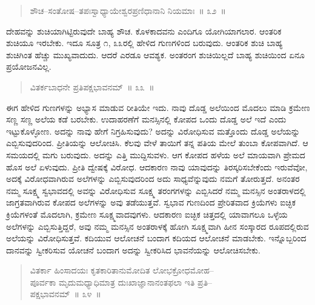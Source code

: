 \vspace{-0.3cm}

\begin{verse}
ಶೌಚ–ಸಂತೋಷ–ತಪಃಸ್ವಾಧ್ಯಾಯೇಶ್ವರಪ್ರಣಿಧಾನಾನಿ ನಿಯಮಾಃ~॥ ೩೨~॥
\end{verse}

\vspace{-0.3cm}


ದೇಹವನ್ನು ಶುಚಿಯಾಗಿಟ್ಟಿರುವುದೇ ಬಾಹ್ಯ ಶೌಚ. ಕೊಳಕಾದವನು ಎಂದಿಗೂ ಯೋಗಿಯಾಗಲಾರ. ಆಂತರಿಕ ಶುಚಿಯೂ ಇರಬೇಕು. ಇದೂ ಸೂತ್ರ ೧, ೩೩ರಲ್ಲಿ ಹೇಳಿದ ಗುಣಗಳಿಂದ ಬರುವುದು. ಆಂತರಿಕ ಶುಚಿ ಬಾಹ್ಯ ಶುಚಿಗಿಂತ ಹೆಚ್ಚು ಮುಖ್ಯವಾದುದು. ಆದರೆ ಎರಡೂ ಆವಶ್ಯಕ. ಅಂತರಂಗ ಶುಚಿಯಿಲ್ಲದೆ ಬಾಹ್ಯ ಶುಚಿಯಿಂದ ಏನೂ ಪ್ರಯೋಜನವಿಲ್ಲ. 

\vspace{-0.45cm}

\begin{verse}
ವಿತರ್ಕಬಾಧನೇ ಪ್ರತಿಪಕ್ಷಭಾವನಮ್​~॥ ೩೩~॥
\end{verse}

\vspace{-0.45cm}


ಈಗ ಹೇಳಿದ ಗುಣಗಳನ್ನು ಅಭ್ಯಾಸ ಮಾಡುವ ರೀತಿಯೇ ಇದು. ನಾವು ದೊಡ್ಡ ಅಲೆಯಿಂದ ಮೊದಲು ಮಾಡಿ ಕ್ರಮೇಣ ಸಣ್ಣ ಸಣ್ಣ ಅಲೆಯ ಕಡೆ ಬರಬೇಕು. ಉದಾಹರಣೆಗೆ ಮನಸ್ಸಿನಲ್ಲಿ ಕೋಪದ ಒಂದು ದೊಡ್ಡ ಅಲೆ ಇದೆ ಎಂದು ಇಟ್ಟುಕೊಳ್ಳೋಣ. ಅದನ್ನು ನಾವು ಹೇಗೆ ನಿಗ್ರಹಿಸುವುದು? ಅದನ್ನು ವಿರೋಧಿಸುವ ಮತ್ತೊಂದು ದೊಡ್ಡ ಅಲೆಯನ್ನು ಎಬ್ಬಿಸುವುದರಿಂದ. ಪ್ರೀತಿಯನ್ನು ಆಲೋಚಿಸಿ. ಕೆಲವು ವೇಳೆ ತಾಯಿಗೆ ತನ್ನ ಪತಿಯ ಮೇಲೆ ತುಂಬಾ ಕೋಪವಾಗಿದೆ. ಆ ಸಮಯದಲ್ಲಿ ಮಗು ಬರುವುದು. ಅದನ್ನು ಎತ್ತಿ ಮುದ್ದಿಸುವಳು. ಆಗ ಕೋಪದ ಹಳೆಯ ಅಲೆ ಮಾಯವಾಗಿ ಪ್ರೇಮದ ಹೊಸ ಅಲೆ ಏಳುವುದು. ಪ್ರೀತಿ ದ್ವೇಷಕ್ಕೆ ವಿರೋಧ. ಆದಕಾರಣ ನಾವು ಯಾವುದನ್ನು ತಿರಸ್ಕರಿಸಬೇಕೆಂದು ಇರುವೆವೋ, ಅದಕ್ಕೆ ವಿರೋಧವಾಗಿರುವ ಅಲೆಗಳನ್ನು ಎಬ್ಬಿಸುವುದರಿಂದ ಅದು ಸಾಧ್ಯವೆನ್ನುವುದು ನಮಗೆ ತೋರುತ್ತದೆ. ಅನಂತರ ನಮ್ಮ ಸೂಕ್ಷ್ಮ ಸ್ವಭಾವದಲ್ಲಿ ಅವನ್ನು ವಿರೋಧಿಸುವ ಸೂಕ್ಷ್ಮ ತರಂಗಗಳನ್ನು ಎಬ್ಬಿಸಿದರೆ ನಮ್ಮ ಮನಸ್ಸಿನ ಅಂತರಾಳದಲ್ಲಿ ಜಾಗ್ರತವಾಗಿರುವ ಕೋಪದ ಅಲೆಗಳನ್ನು ಅವು ತಡೆಯುತ್ತವೆ. ಸ್ವಭಾವ ಗುಣದಿಂದ ಪ್ರೇರಿತವಾದ ಕ್ರಿಯೆಗಳು ಐಚ್ಛಿಕ ಕ್ರಿಯೆಗಳಂತೆ ಮೊದಲಾಗಿ, ಕ್ರಮೇಣ ಸೂಕ್ಷ್ಮವಾದವುಗಳು. ಆದಕಾರಣ ಐಚ್ಛಿಕ ಚಿತ್ತದಲ್ಲಿ ಯಾವಾಗಲೂ ಒಳ್ಳೆಯ ಅಲೆಗಳನ್ನು ಎಬ್ಬಿಸುತ್ತಿದ್ದರೆ, ಅವು ನಮ್ಮ ಮನಸ್ಸಿನ ಅಂತರಾಳಕ್ಕೆ ಹೋಗಿ ಸೂಕ್ಷ್ಮವಾಗಿ ಹೀನ ಸಂಸ್ಕಾರದ ರೂಪದಲ್ಲಿರುವ ಅಲೆಯನ್ನು ವಿರೋಧಿಸುತ್ತವೆ. ಕದಿಯುವ ಆಲೋಚನೆ ಬಂದಾಗ ಕದಿಯದ ಆಲೋಚನೆ ಮಾಡಬೇಕು. ಇನ್ನೊಬ್ಬರಿಂದ ದಾನವನ್ನು ಸ್ವೀಕರಿಸುವ ಯೋಚನೆ ಬಂದಾಗ ಅದನ್ನು ಸ್ವೀಕರಿಸಿದ ಭಾವನೆಯನ್ನು ಆಲೋಚಿಸಬೇಕು. 

\vspace{-0.4cm}

\begin{verse}
ವಿತರ್ಕಾ ಹಿಂಸಾದಯಃ ಕೃತಕಾರಿತಾನುಮೋದಿತ ಲೋಭಕ್ರೋಧಮೋಹ–\\ಪೂರ್ವಕಾ ಮೃದುಮಧ್ಯಾಧಿಮಾತ್ರ ದುಃಖಾಜ್ಞಾನಾನಂತಫಲಾ ಇತಿ ಪ್ರತಿ–\\ಪಕ್ಷಭಾವನಮ್​~॥ ೩೪~॥
\end{verse}

